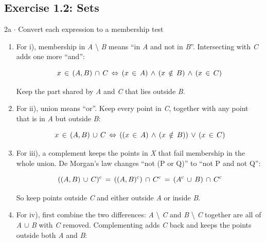 \documentclass[11pt]{article}
\begin{document}
\begin{keepsection}\subsection{Exercise 1.2: Sets}

\begin{workedbox}{2a \ensuremath{\cdot} Convert each expression to a membership test}
\begin{enumerate}
\item {}
For i), membership in \textit{A} \textbackslash{} \textit{B} means “in \textit{A} and not in \textit{B}”. Intersecting with \textit{C} adds one more “and”:

\begin{equation*}{x}\, \in \, ({A}\, \\, {B})\, \cap \, {C}\, \Leftrightarrow \, ({x}\, \in \, {A})\, \land \, ({x}\, \notin \, {B})\, \land \, ({x}\, \in \, {C})\end{equation*}

Keep the part shared by \textit{A} and \textit{C} that lies outside \textit{B}.
\item {}
For ii), union means “or”. Keep every point in \textit{C}, together with any point that is in \textit{A} but outside \textit{B}:

\begin{equation*}{x}\, \in \, ({A}\, \\, {B})\, \cup \, {C}\, \Leftrightarrow \, (({x}\, \in \, {A})\, \land \, ({x}\, \notin \, {B}))\, \lor \, ({x}\, \in \, {C})\end{equation*}
\item {}
For iii), a complement keeps the points in \textit{X} that fail membership in the whole union. De Morgan’s law changes “not (P or Q)” to “not P and not Q”:

\begin{equation*}(({A}\, \\, {B})\, \cup \, {C})^{\mathrm{c}}\, =\, (({A}\, \\, {B})^{\mathrm{c}})\, \cap \, {C}^{\mathrm{c}}\, =\, ({A}^{\mathrm{c}}\, \cup \, {B})\, \cap \, {C}^{\mathrm{c}}\end{equation*}

So keep points outside \textit{C} and either outside \textit{A} or inside \textit{B}.
\item {}
For iv), first combine the two differences: \textit{A} \textbackslash{} \textit{C} and \textit{B} \textbackslash{} \textit{C} together are all of \textit{A} \ensuremath{\cup} \textit{B} with \textit{C} removed. Complementing adds \textit{C} back and keeps the points outside both \textit{A} and \textit{B}:


\end{enumerate}
\end{workedbox}
\end{keepsection}
\end{document}

